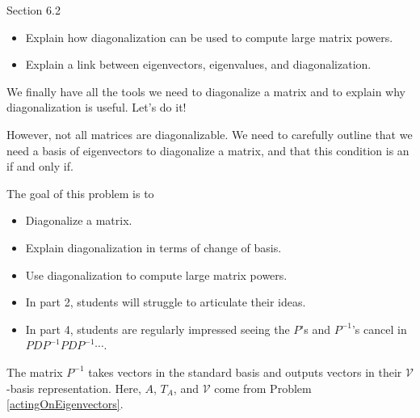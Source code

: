 \documentclass{problemset}
\newcommand{\bookonlynewpage}{\begin{bookonly}\newpage\end{bookonly}}
\begin{document}
\begin{lesson}

	Section 6.2

	\begin{itemize}
		\item Explain how diagonalization can be used to compute large matrix powers.
		\item Explain a link between eigenvectors, eigenvalues, and diagonalization.

	\end{itemize}

	We finally have all the tools we need to diagonalize a matrix and to explain why diagonalization is useful.
	Let's do it!

	However, not all matrices are diagonalizable. We need to carefully outline that we need a
	basis of eigenvectors to diagonalize a matrix, and that this condition is an if and only if.

\end{lesson}
	\bookonlynewpage
	\question
	\begin{annotation}
		\begin{goals}

			The goal of this problem is to
			\begin{itemize}
				\item Diagonalize a matrix.
				\item Explain diagonalization in terms of change of basis.
				\item Use diagonalization to compute large matrix powers.
			\end{itemize}
		\end{goals}

		\begin{notes}
			\begin{itemize}
				\item In part 2, students will struggle to articulate their ideas.
				\item In part 4, students are regularly impressed seeing the $P$'s and
					$P^{-1}$'s cancel in $PDP^{-1}PDP^{-1}\cdots$.
			\end{itemize}
		\end{notes}
	\end{annotation}
	The matrix $P^{-1}$ takes vectors in the standard basis and outputs
	vectors in their $\mathcal V$-basis representation. Here, $A$, $T_A$, and $\mathcal V$
	come from Problem \ref{actingOnEigenvectors}.
\end{document}
